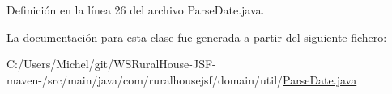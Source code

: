 Definición en la línea 26 del archivo Parse\+Date.\+java.



La documentación para esta clase fue generada a partir del siguiente fichero\+:\begin{DoxyCompactItemize}
\item 
C\+:/\+Users/\+Michel/git/\+W\+S\+Rural\+House-\/\+J\+S\+F-\/maven-\//src/main/java/com/ruralhousejsf/domain/util/\mbox{\hyperlink{_parse_date_8java}{Parse\+Date.\+java}}\end{DoxyCompactItemize}
